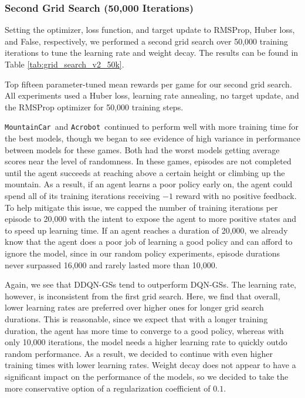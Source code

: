 \documentclass[11pt]{article}
\newcommand{\ab}{\texttt{Acrobot}}
\newcommand{\mc}{\texttt{MountainCar}}
\begin{document}
\subsubsection{Second Grid Search (50,000 Iterations)}
 
Setting the optimizer, loss function, and target update to RMSProp, Huber loss, and False, respectively, we performed a second grid search over 50,000 training iterations to tune the learning rate and weight decay. The results can be found in Table \ref{tab:grid_search_v2_50k}.

\begin{table}[!ht]
    \footnotesize
    \centering
    
    
    \caption{Top fifteen parameter-tuned mean rewards per game for our second grid search. All experiments used a Huber loss, learning rate annealing, no target update, and the RMSProp optimizer for 50,000 training steps.}
    \label{tab:grid_search_v2_50k}
\end{table}

\mc~and \ab~continued to perform well with more training time for the best models, though we began to see evidence of high variance in performance between models for these games. Both had the worst models getting average scores near the level of randomness. In these games, episodes are not completed until the agent succeeds at reaching above a certain height or climbing up the mountain. As a result, if an agent learns a poor policy early on, the agent could spend all of its training iterations receiving $-1$ reward with no positive feedback. To help mitigate this issue, we capped the number of training iterations per episode to 20,000 with the intent to expose the agent to more positive states and to speed up learning time. If an agent reaches a duration of 20,000, we already know that the agent does a poor job of learning a good policy and can afford to ignore the model, since in our random policy experiments, episode durations never surpassed 16,000 and rarely lasted more than 10,000.

Again, we see that DDQN-GSs tend to outperform DQN-GSs. The learning rate, however, is inconsistent from the first grid search. Here, we find that overall, lower learning rates are preferred over higher ones for longer grid search durations. This is reasonable, since we expect that with a longer training duration, the agent has more time to converge to a good policy, whereas with only 10,000 iterations, the model needs a higher learning rate to quickly outdo random performance. As a result, we decided to continue with even higher training times with lower learning rates. Weight decay does not appear to have a significant impact on the performance of the models, so we decided to take the more conservative option of a regularization coefficient of $0.1$.
\end{document}
